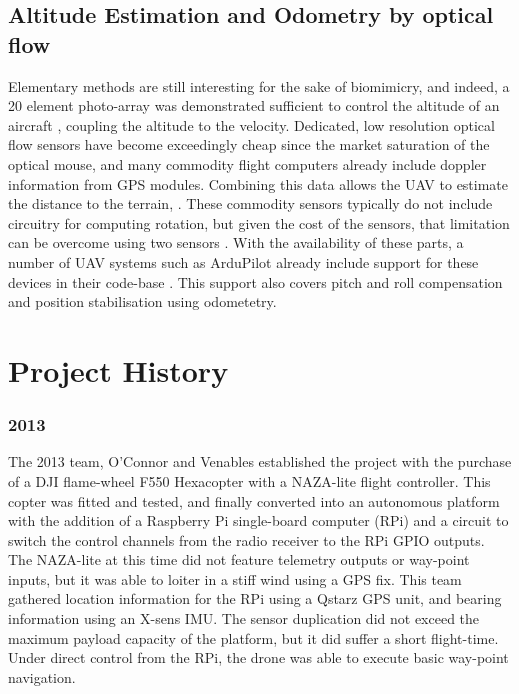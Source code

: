 \documentclass[a4paper, 11pt, titlepage]{article}
\begin{document}
    \subsection{Altitude Estimation and Odometry by optical flow}
      Elementary methods are still interesting for the sake of biomimicry, and indeed, a 20 element photo-array was demonstrated sufficient to control the altitude of an aircraft \cite{optoAlt}, coupling the altitude to the velocity.
      Dedicated, low resolution optical flow sensors have become exceedingly cheap since the market saturation of the optical mouse, and many commodity flight computers already include doppler information from GPS modules. 
      Combining this data allows the UAV to estimate the distance to the terrain, \cite{RemTerrain}.  These commodity sensors typically do not include circuitry for computing rotation, but given the cost of the sensors, that limitation can be overcome using two sensors \cite{FlowRot}.
      With the availability of these parts, a number of UAV systems such as ArduPilot already include support for these devices in their code-base \cite{ArduFlow}.
      This support also covers pitch and roll compensation and position stabilisation using odometetry.


\section{Project History}

    \subsubsection{2013}
      The 2013 team, O'Connor \cite{OConnor} and Venables \cite{Venables} established the project with the purchase of a DJI flame-wheel F550 Hexacopter with a NAZA-lite flight controller.  This copter was fitted and tested, and finally converted into an autonomous platform with the addition of a Raspberry Pi single-board computer (RPi) and a circuit to switch the control channels from the radio receiver to the RPi GPIO outputs.
      The NAZA-lite at this time did not feature telemetry outputs or way-point inputs, but it was able to loiter in a stiff wind using a GPS fix.
      This team gathered location information for the RPi using a Qstarz GPS unit, and bearing information using an X-sens IMU.  The sensor duplication did not exceed the maximum payload capacity of the platform, but it did suffer a short flight-time.
      Under direct control from the RPi, the drone was able to execute basic way-point navigation.
\end{document}

